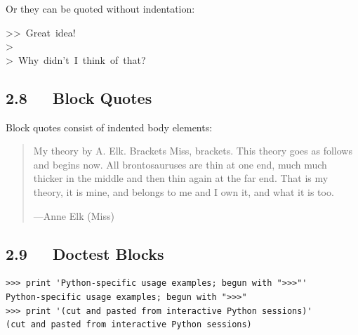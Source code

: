 \documentclass[10pt,english]{article}
\begin{document}
Or they can be quoted without indentation:
\begin{ttfamily}\begin{flushleft}
>>~Great~idea!~\\
>~\\
>~Why~didn't~I~think~of~that?
\end{flushleft}\end{ttfamily}



\hypertarget{block-quotes}{}
\subsection*{2.8~~~Block Quotes}

Block quotes consist of indented body elements:
\begin{quote}

My theory by A. Elk.  Brackets Miss, brackets.  This theory goes
as follows and begins now.  All brontosauruses are thin at one
end, much much thicker in the middle and then thin again at the
far end.  That is my theory, it is mine, and belongs to me and I
own it, and what it is too.

\begin{flushright}
---Anne Elk (Miss)
\end{flushright}
\end{quote}



\hypertarget{doctest-blocks}{}
\subsection*{2.9~~~Doctest Blocks}
\begin{verbatim}>>> print 'Python-specific usage examples; begun with ">>>"'
Python-specific usage examples; begun with ">>>"
>>> print '(cut and pasted from interactive Python sessions)'
(cut and pasted from interactive Python sessions)\end{verbatim}



\hypertarget{footnotes}{}
\end{document}
